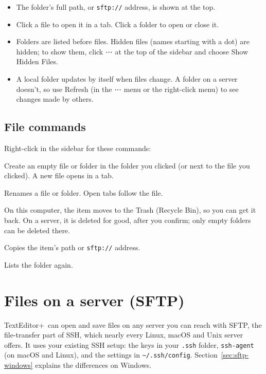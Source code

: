 \documentclass[11pt,a4paper]{article}
\newcommand{\appname}{TextEditor+}
\newcommand{\ui}[1]{\textsf{#1}}
\begin{document}
\begin{itemize}
  \item The folder's full path, or \texttt{sftp://} address, is shown at the
        top.
  \item Click a file to open it in a tab. Click a folder to open or close it.
  \item Folders are listed before files. Hidden files (names starting with a
        dot) are hidden; to show them, click \ui{⋯} at the top of the sidebar
        and choose \ui{Show Hidden Files}.
  \item A local folder updates by itself when files change. A folder on a
        server doesn't, so use \ui{Refresh} (in the \ui{⋯} menu or the
        right-click menu) to see changes made by others.
\end{itemize}

\subsection{File commands}

Right-click in the sidebar for these commands:

\begin{description}[leftmargin=1.5em]
  \item[\ui{New File…}, \ui{New Folder…}] Create an empty file or folder in
    the folder you clicked (or next to the file you clicked). A new file opens
    in a tab.
  \item[\ui{Rename…}] Renames a file or folder. Open tabs follow the file.
  \item[\ui{Move to Trash…} / \ui{Delete…}] On this computer, the item moves
    to the Trash (Recycle Bin), so you can get it back. On a server, it is
    deleted for good, after you confirm; only empty folders can be deleted
    there.
  \item[\ui{Copy Path}] Copies the item's path or \texttt{sftp://} address.
  \item[\ui{Refresh}] Lists the folder again.
\end{description}

\section{Files on a server (SFTP)}\label{sec:sftp}

\appname\ can open and save files on any server you can reach with SFTP, the
file-transfer part of SSH, which nearly every Linux, macOS and Unix server
offers. It uses your existing SSH setup: the keys in your \texttt{.ssh}
folder, \texttt{ssh-agent} (on macOS and Linux), and the settings in
\texttt{\textasciitilde/.ssh/config}. Section~\ref{sec:sftp-windows} explains
the differences on Windows.
\end{document}
